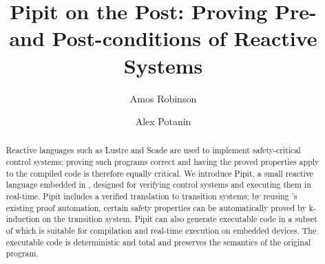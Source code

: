 \documentclass[a4paper,UKenglish,cleveref, autoref, thm-restate]{lipics-v2021}
\title{Pipit on the Post: Proving Pre- and Post-conditions of Reactive Systems}
\author{Amos Robinson}{Australian National University, Canberra, Australia}{amos.robinson@anu.edu.au}{https://orcid.org/0009-0004-4837-4981}{}
\author{Alex Potanin}{Australian National University, Canberra, Australia}{alex.potanin@anu.edu.au}{https://orcid.org/0000-0002-4242-2725}{}
\begin{document}
\maketitle

\begin{abstract}
  Reactive languages such as Lustre and Scade are used to implement safety-critical control systems; proving such programs correct and having the proved properties apply to the compiled code is therefore equally critical.
  We introduce Pipit, a small reactive language embedded in \fstar{}, designed for verifying control systems and executing them in real-time.
  Pipit includes a verified translation to transition systems; by reusing \fstar{}'s existing proof automation, certain safety properties can be automatically proved by k-induction on the transition system.
  Pipit can also generate executable code in a subset of \fstar{} which is suitable for compilation and real-time execution on embedded devices.
  The executable code is deterministic and total and preserves the semantics of the original program.
\end{abstract}


\makeatactive
















\end{document}
